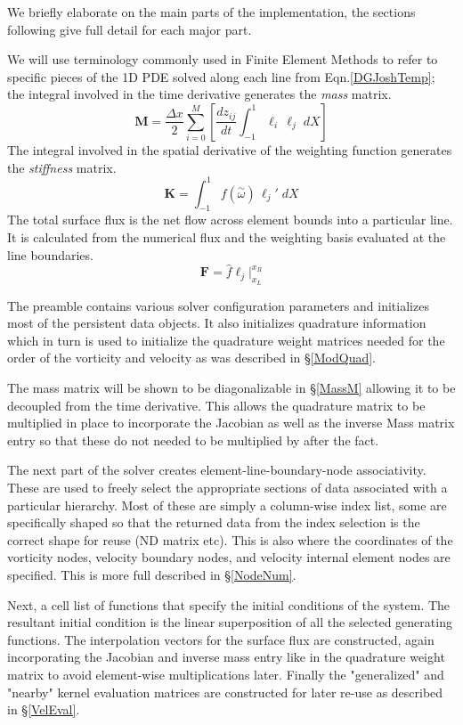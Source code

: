 \documentclass[letterpaper,12pt]{report}
\newcommand{\be}{\begin{equation}}
\newcommand{\ee}{\end{equation}}
\newcommand{\aomega}{\overset{\sim}{\omega}}				%
\begin{document}
We briefly elaborate on the main parts of the implementation, the sections following give full detail for each major part.

We will use terminology commonly used in Finite Element Methods to refer to specific pieces of the 1D PDE solved along each line from Eqn.\eqref{DGJoshTemp}; the integral involved in the time derivative generates the \textit{mass} matrix.
\be \boldsymbol{M} = \frac{\Delta x}{2} \sum_{i=0}^M \left[ \frac{d z_{ij}}{dt}	\int_{-1}^{1}\ell_i  \, \ell_j \;dX \right] \ee
The integral involved in the spatial derivative of the weighting function generates the \textit{stiffness} matrix.
\be \boldsymbol{K} = \int_{-1}^{1} f(\aomega) \, \ell_j' \;dX \ee
The total surface flux is the net flow across element bounds into a particular line. It is calculated from the numerical flux and the weighting basis evaluated at the line boundaries.
\be \boldsymbol{F} = \hat{f}\ell_j \Big|^{x_R}_{x_L} \ee

The preamble contains various solver configuration parameters and initializes most of the persistent data objects. It also initializes quadrature information which in turn is used to initialize the quadrature weight matrices needed for the order of the vorticity and velocity as was described in \S\ref{ModQuad}.

The mass matrix will be shown to be diagonalizable in \S\ref{MassM} allowing it to be decoupled from the time derivative. This allows the quadrature matrix to be multiplied in place to incorporate the Jacobian as well as the inverse Mass matrix entry so that these do not needed to be multiplied by after the fact. 

The next part of the solver creates element-line-boundary-node associativity. These are used to freely select the appropriate sections of data associated with a particular hierarchy. Most of these are simply a column-wise index list, some are specifically shaped so that the returned data from the index selection is the correct shape for reuse (ND matrix etc). This is also where the coordinates of the vorticity nodes, velocity boundary nodes, and velocity internal element nodes are specified. This is more full described in \S\ref{NodeNum}.

Next, a cell list of functions that specify the initial conditions of the system. The resultant initial condition is the linear superposition of all the selected generating functions. The interpolation vectors for the surface flux are constructed, again incorporating the Jacobian and inverse mass entry like in the quadrature weight matrix to avoid element-wise multiplications later. Finally the "generalized" and "nearby" kernel evaluation matrices are constructed for later re-use as described in \S\ref{VelEval}.
\end{document}
